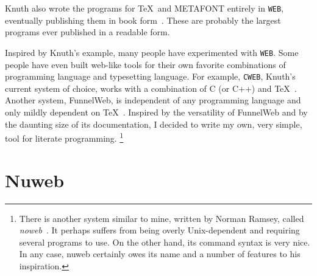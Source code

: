 Knuth also wrote the programs for \TeX\ and {\small\sf METAFONT}
entirely in \verb|WEB|, eventually publishing them in book
form~\cite{tex:program,metafont:program}. These are probably the
largest programs ever published in a readable form.

Inspired by Knuth's example, many people have experimented with
\verb|WEB|\@. Some people have even built web-like tools for their
own favorite combinations of programming language and typesetting
language. For example, \verb|CWEB|, Knuth's current system of choice,
works with a combination of C (or C++) and \TeX~\cite{levy:90}.
Another system, FunnelWeb, is independent of any programming language
and only mildly dependent on \TeX~\cite{funnelweb}. Inspired by the
versatility of FunnelWeb and by the daunting size of its
documentation, I decided to write my own, very simple, tool for
literate programming.%
\footnote{There is another system similar to
mine, written by Norman Ramsey, called {\em noweb}~\cite{noweb}. It
perhaps suffers from being overly Unix-dependent and requiring several
programs to use. On the other hand, its command syntax is very nice.
In any case, nuweb certainly owes its name and a number of features to
his inspiration.}


\section{Nuweb}

